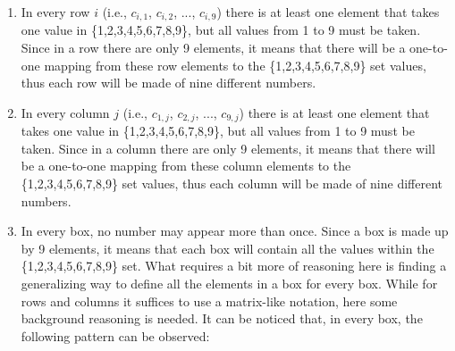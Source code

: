 \documentclass[]{usiinfprospectus}
\newcounter{row}
\newcounter{col}
\begin{document}
\begin{enumerate}[label={(\arabic*)}]
\item In every row $i$ (i.e., $c_{i,1}$, $c_{i,2}$, ..., $c_{i,9}$) there is at least one element that takes one value in \{1,2,3,4,5,6,7,8,9\}, but all values from 1 to 9 must be taken. Since in a row there are only 9 elements, it means that there will be a one-to-one mapping from these row elements to the \{1,2,3,4,5,6,7,8,9\} set values, thus each row will be made of nine different numbers.
\item In every column $j$ (i.e., $c_{1,j}$, $c_{2,j}$, ..., $c_{9,j}$) there is at least one element that takes one value in \{1,2,3,4,5,6,7,8,9\}, but all values from 1 to 9 must be taken. Since in a column there are only 9 elements, it means that there will be a one-to-one mapping from these column elements to the \{1,2,3,4,5,6,7,8,9\} set values, thus each column will be made of nine different numbers.
\item In every box, no number may appear more than once. Since a box is made up by 9 elements, it means that each box will contain all the values within the \{1,2,3,4,5,6,7,8,9\} set. What requires a bit more of reasoning here is finding a generalizing way to define all the elements in a box for every box. While for rows and columns it suffices to use a matrix-like notation, here some background reasoning is needed. It can be noticed that, in every box, the following pattern can be observed:
\begin{figure}[h]
\begin{center}
\end{center}
\end{figure}
\end{enumerate}
\end{document}
